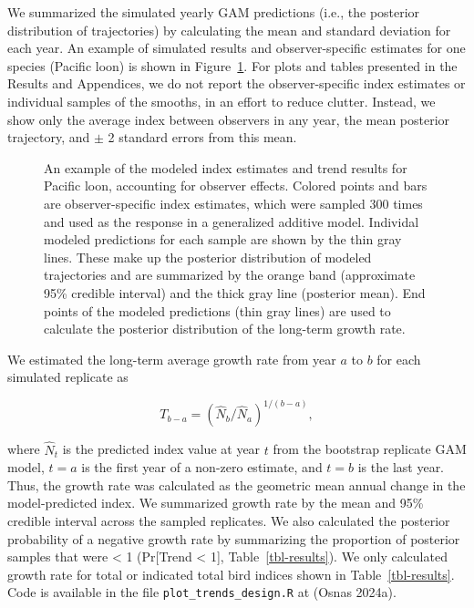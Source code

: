 \documentclass[
]{article}
\begin{document}
\newpage{}

We summarized the simulated yearly GAM predictions (i.e., the posterior
distribution of trajectories) by calculating the mean and standard
deviation for each year. An example of simulated results and
observer-specific estimates for one species (Pacific loon) is shown in
Figure~\ref{fig-loon}. For plots and tables presented in the Results and
Appendices, we do not report the observer-specific index estimates or
individual samples of the smooths, in an effort to reduce clutter.
Instead, we show only the average index between observers in any year,
the mean posterior trajectory, and \(\pm\) 2 standard errors from this
mean.

\begin{figure}


\caption{\label{fig-loon}An example of the modeled index estimates and
trend results for Pacific loon, accounting for observer effects. Colored
points and bars are observer-specific index estimates, which were
sampled 300 times and used as the response in a generalized additive
model. Individal modeled predictions for each sample are shown by the
thin gray lines. These make up the posterior distribution of modeled
trajectories and are summarized by the orange band (approximate 95\%
credible interval) and the thick gray line (posterior mean). End points
of the modeled predictions (thin gray lines) are used to calculate the
posterior distribution of the long-term growth rate.}

\end{figure}%

We estimated the long-term average growth rate from year \(a\) to \(b\)
for each simulated replicate as

\[T_{b-a} = (\hat N_{b}/\hat N_{a})^{1/(b-a)},\]

where \(\hat N_t\) is the predicted index value at year \(t\) from the
bootstrap replicate GAM model, \(t = a\) is the first year of a non-zero
estimate, and \(t = b\) is the last year. Thus, the growth rate was
calculated as the geometric mean annual change in the model-predicted
index. We summarized growth rate by the mean and 95\% credible interval
across the sampled replicates. We also calculated the posterior
probability of a negative growth rate by summarizing the proportion of
posterior samples that were \textless{} 1 (Pr{[}Trend \textless{} 1{]},
Table~\ref{tbl-results}). We only calculated growth rate for total or
indicated total bird indices shown in Table~\ref{tbl-results}. Code is
available in the file \texttt{plot\_trends\_design.R} at (Osnas 2024a).
\end{document}
